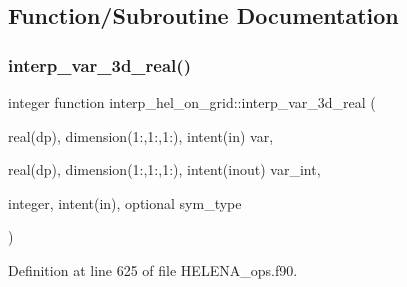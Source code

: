 \subsection{Function/\+Subroutine Documentation}
\mbox{\label{HELENA__ops_8f90_a0480c2cb24b13d76286e1f2b0fe100a1}} 
\subsubsection{\texorpdfstring{interp\+\_\+var\+\_\+3d\+\_\+real()}{interp\_var\_3d\_real()}}
{\footnotesize\ttfamily integer function interp\+\_\+hel\+\_\+on\+\_\+grid\+::interp\+\_\+var\+\_\+3d\+\_\+real (\begin{DoxyParamCaption}\item[{real(dp), dimension(1\+:,1\+:,1\+:), intent(in)}]{var,  }\item[{real(dp), dimension(1\+:,1\+:,1\+:), intent(inout)}]{var\+\_\+int,  }\item[{integer, intent(in), optional}]{sym\+\_\+type }\end{DoxyParamCaption})}



Definition at line 625 of file H\+E\+L\+E\+N\+A\+\_\+ops.\+f90.

